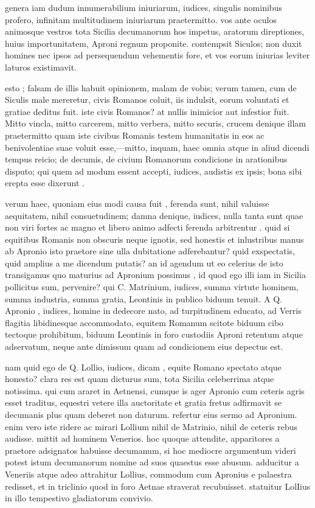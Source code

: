  genera iam dudum innumerabilium iniuriarum, iudices, singulis nominibus profero, infinitam multitudinem iniuriarum praetermitto. vos ante oculos animosque vestros tota Sicilia decumanorum hos impetus, aratorum direptiones, huius importunitatem, Aproni regnum proponite. contempsit Siculos; non duxit homines nec ipsos ad persequendum vehementis fore, et vos eorum iniurias leviter laturos existimavit.

 esto ; falsam de illis habuit opinionem, malam de vobis; verum tamen, cum de Siculis male mereretur, civis Romanos coluit, iis indulsit, eorum voluntati et gratiae deditus fuit. iste civis Romanos? at nullis inimicior aut infestior fuit. Mitto vincla, mitto carcerem, mitto verbera, mitto securis, crucem denique illam praetermitto quam iste civibus Romanis testem humanitatis in eos ac benivolentiae suae voluit esse,—mitto, inquam, haec omnia atque in aliud dicendi tempus reicio; de decumis, de civium Romanorum condicione in arationibus disputo; qui quem ad modum essent accepti, iudices, audistis ex ipsis; bona sibi erepta esse dixerunt .

 verum haec, quoniam eius modi causa fuit , ferenda sunt, nihil valuisse aequitatem, nihil consuetudinem; damna denique, iudices, nulla tanta sunt quae non viri fortes ac magno et libero animo adfecti ferenda arbitrentur . quid si equitibus Romanis non obscuris neque ignotis, sed honestis et inlustribus manus ab Apronio isto praetore sine ulla dubitatione adferebantur? quid exspectatis, quid amplius a me dicendum putatis? an id agendum ut eo celerius de isto transigamus quo maturius ad Apronium possimus , id quod ego illi iam in Sicilia pollicitus sum, pervenire? qui C. Matrinium, iudices, summa virtute hominem, summa industria, summa gratia, Leontinis in publico biduum tenuit. A Q. Apronio , iudices, homine in dedecore nato, ad turpitudinem educato, ad Verris flagitia libidinesque accommodato, equitem Romanum scitote biduum cibo tectoque prohibitum, biduum Leontinis in foro custodiis Aproni retentum atque adservatum, neque ante dimissum quam ad condicionem eius depectus est.

 nam quid ego de Q. Lollio, iudices, dicam , equite Romano spectato atque honesto? clara res est quam dicturus sum, tota Sicilia celeberrima atque notissima. qui cum araret in Aetnensi, cumque is ager Apronio cum ceteris agris esset traditus, equestri vetere illa auctoritate et gratia fretus adfirmavit se decumanis plus quam deberet non daturum. refertur eius sermo ad Apronium. enim vero iste ridere ac mirari Lollium nihil de Matrinio, nihil de ceteris rebus audisse. mittit ad hominem Venerios. hoc quoque attendite, apparitores a praetore adsignatos habuisse decumanum, si hoc mediocre argumentum videri potest istum decumanorum nomine ad suos quaestus esse abusum. adducitur a Veneriis atque adeo attrahitur Lollius, commodum cum Apronius e palaestra redisset, et in triclinio quod in foro Aetnae straverat recubuisset. statuitur LolIius in illo tempestivo gladiatorum convivio.

